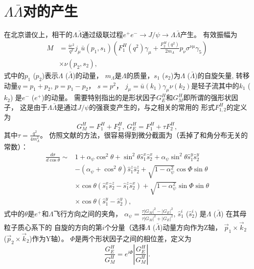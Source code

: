 \section{$\Lambda\bar{\Lambda}$对的产生}
在北京谱仪上，相干的$\Lambda \bar{\Lambda}$通过级联过程$e^+e^- \to J/\psi \to \Lambda \bar{\Lambda}$产生。
有效振幅为
\begin{equation}
    \begin{split}
        M &= \frac{ie^2}{q^{2}} j_{\mu} \bar{u}(p_{1}, s_1) \left( F^H_1(q^2) \gamma_{\mu} +
        \frac{F^H_2(q^2)}{2m_{\Lambda}} p_{\nu} \sigma^{\nu\mu}  \gamma_5 \right) \\
        & \times \nu(p_2, s_2),
    \end{split}
\end{equation}
式中的$p_1$ ($p_2$)表示$\Lambda$ ($\bar{\Lambda}$)的动量， 
$m_{\Lambda}$是$\Lambda$的质量，$s_1$ ($s_2$)为$\Lambda$ ($\bar{\Lambda}$)的自旋矢量, 
转移动量$q = p_{1} + p_{2}$, $p = p_{1} - p_{2}$， $s = p^{2}$，
$j_{\mu} = \bar{u}(k_1) \gamma_{\mu} \nu(k_2)$是轻子流其中的$k_{1}$ ($k_{2}$)
是$e^{-}$ ($e^{+}$)的动量。 
需要特别指出的是形状因子$G^H_{E}$和$G^H_{M}$即所谓的强形状因子\cite{Faldt:2016qee}，
这是由于$\Lambda\bar{\Lambda}$是通过$J/\psi$的强衰变产生的\cite{Faldt:2017kgy}，与之相关的常用的
形式$F^H_{1,2}$的定义为
\begin{equation}
    G^H_{M} = F^H_1 + F^H_2,~G^H_{E} = F^H_1 + \tau F^H_2,
\end{equation}
其中$\tau = \frac{q^2}{4 m_{\Lambda}^2}$。
仿照文献\cite{Dubnickova:1992ii,Gakh:2005hh,Czyz:2007wi}的方法，很容易得到微分截面为（丢掉了和角分布无关的常数）：
\begin{equation}
\label{eq:jpsi_LL}
    \begin{split}
        \frac{d\sigma}{d \cos\theta}  \sim & 1+ \alpha _{\psi } \cos^2\theta
        + \sin ^2\theta \hat{s}_{1}^x \hat{s}_{2}^x
        + \alpha_{\psi} \sin^2\theta \hat{s}_{1}^y \hat{s}_{2}^y \\
        &- \left( \alpha_{\psi} +\cos^2 \theta  \right)\hat{s}_{1}^z \hat{s}_{2}^z
        + \sqrt{1-\alpha_{\psi}^2} \cos\Phi  \sin\theta \\
        & \times    \cos\theta
        \left( \hat{s}_{1}^x \hat{s}_{2}^z  - \hat{s}_{1}^z \hat{s}_{2}^x\right)
        +\sqrt{1-\alpha _{\psi}^2}
        \sin\Phi  \sin\theta \\
        & \times \cos\theta  (\hat{s}_{1}^y - \hat{s}_{2}^y),
    \end{split}
\end{equation}
式中的$\theta$是$e^{+}$和$\Lambda$飞行方向之间的夹角，
$\alpha_{\psi} = \frac{\tau |G_{M}|^{2} -  |G_{E}|^{2}}{\tau |G_{M}|^{2} + |G_{E}|^{2}}$,
$\hat{s}^{i}_1$ ($\hat{s}^{i}_2$) 是$\Lambda$ ($\bar{\Lambda}$) 在其母粒子质心系下的
自旋的方向的第$i$个分量（选择$\Lambda$ ($\bar{\Lambda}$)动量方向作为Z轴，
$\vec{p}_1 \times \vec{k}_2$ ($\vec{p}_2 \times \vec{k}_2$)作为Y轴）。
$\Phi$是两个形状因子之间的相位差，定义为
\begin{equation}
    \frac{G^H_{E}}{G^H_{M}} = e^{i \Phi} \left|\frac{G^H_{E}}{G^H_{M}} \right |.
\end{equation}

